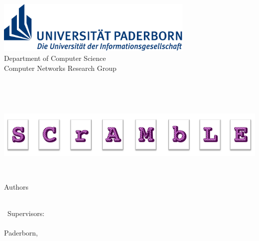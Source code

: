 


\begin{titlepage}	

	\begin{center}
		\begin{minipage}{135mm}
			\centering
			\includegraphics[height=25mm]{figures/uni-logo}\\
				\vspace{2mm}			
			\textsf{
				\hspace*{8mm} 
				Department of Computer Science\\
				\hspace*{8mm}   Computer Networks Research Group \\
			}	
			
			
		\end{minipage}\\[40pt]
		
		
		

		{\Huge\textbf{\thetitle{}}}\\[30pt]

	\begin{minipage}{4000mm}
	\hspace*{-1.3cm} 
	\includegraphics[height=30mm]{figures/CuK-Logo2_rot}
\end{minipage}\\[10pt]
		\huge Authors\vspace{4mm}
	
		{\huge \textsc{\theauthor{}}}\\[30pt]

		\ Supervisors:\\
		
		{\huge \textsc \thesupervisor{}}\\[30pt]

		Paderborn, \thesubmissiondate{}
	\end{center}
\end{titlepage}


